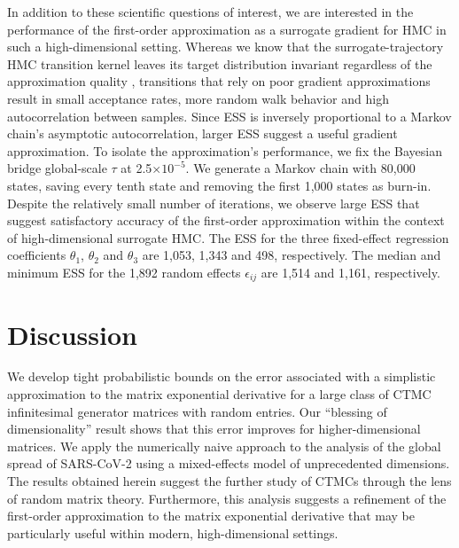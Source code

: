 \documentclass[9pt,twocolumn,twoside]{pnas-new}
\newcommand{\?}{\textbf{?}}
\begin{document}
In addition to these scientific questions of interest, we are
interested in the performance of the first-order approximation as a
surrogate gradient for HMC in such a high-dimensional setting. Whereas we know that the surrogate-trajectory HMC transition kernel leaves its target distribution invariant regardless of the approximation quality \cite{glatt2020accept}, transitions that rely on poor gradient approximations result in small acceptance rates, more random walk behavior and high autocorrelation between samples.  Since ESS is inversely proportional to a Markov chain's asymptotic autocorrelation, larger ESS suggest a useful gradient approximation.  To
isolate the approximation's performance, we fix the Bayesian bridge global-scale
$\tau$ at 2.5$\times10^{-5}$.  We generate a Markov chain with 80,000
states, saving every tenth state and removing the first 1,000 states as
burn-in.  Despite the relatively small number of iterations, we
observe large ESS that suggest satisfactory accuracy of the
first-order approximation within the context of high-dimensional
surrogate HMC.   The ESS for the three fixed-effect regression
coefficients $\theta_1$, $\theta_2$ and $\theta_3$ are 1,053, 1,343
and 498, respectively.  The median and minimum ESS for the 1,892
random effects $\epsilon_{ij}$ are 1,514 and 1,161, respectively.


\section*{Discussion}

We develop tight probabilistic bounds on the error associated
with a simplistic approximation to the matrix exponential derivative
for a large class of CTMC infinitesimal generator matrices with random
entries.  Our ``blessing of dimensionality'' result shows that this
error improves for higher-dimensional matrices.  We apply the
numerically naive approach to the analysis of the global spread of
SARS-CoV-2 using a mixed-effects model of unprecedented dimensions.
The results obtained herein suggest the further study of CTMCs through
the lens of random matrix theory.  Furthermore, this analysis suggests a refinement of the first-order
approximation to the matrix exponential derivative that may be particularly useful within
modern, high-dimensional settings.




\end{document}
